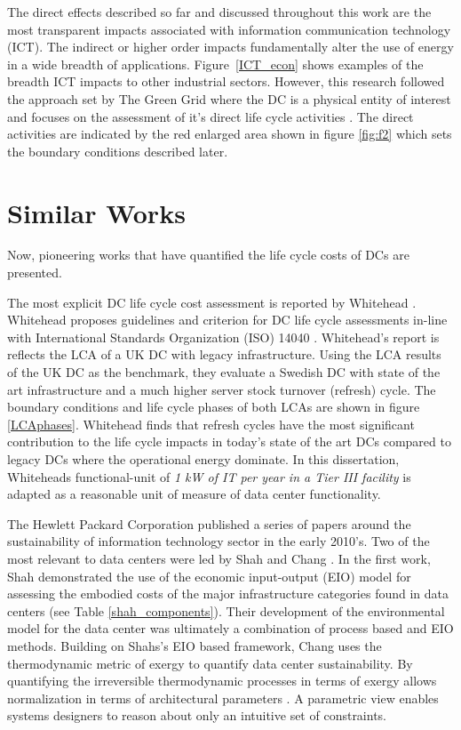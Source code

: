     The direct effects described so far and discussed throughout this work are the most transparent impacts associated with information communication technology (ICT). The indirect or higher order impacts fundamentally alter the use of energy in a wide breadth of applications. Figure~\ref{ICT_econ} shows examples of the breadth ICT impacts to other industrial sectors. However, this research followed the approach set by The Green Grid where the DC is a physical entity of interest and focuses on the assessment of it's direct life cycle activities \cite{tgg12}. The direct activities are indicated by the red enlarged area shown in figure \ref{fig:f2} which sets the boundary conditions described later. 
    
    
    
\section{Similar Works}
 \label{sec: similar works}  
    Now, pioneering works that have quantified the life cycle costs of DCs are presented. 
    
    The most explicit DC life cycle cost assessment is reported by Whitehead \cite{whitehead15}. Whitehead proposes guidelines and criterion for DC life cycle assessments in-line with International Standards Organization (ISO) 14040 \cite{ISO14040}. Whitehead's report is reflects the LCA of a UK DC with legacy infrastructure. Using the LCA results of the UK DC as the benchmark, they evaluate a Swedish DC with state of the art infrastructure and a much higher server stock turnover (refresh) cycle. The boundary conditions and life cycle phases of both LCAs are shown in figure \ref{LCAphases}. Whitehead finds that refresh cycles have the most significant contribution to the life cycle impacts in today's state of the art DCs compared to legacy DCs where the operational energy dominate. In this dissertation, Whiteheads functional-unit of \textit{1 kW of IT per year in a Tier III facility} is adapted as a reasonable unit of measure of data center functionality.
    
    
    
    The Hewlett Packard Corporation published a series of papers around the sustainability of information technology sector in the early 2010's. Two of the most relevant to data centers were led by Shah and Chang \cite{shah11, shah12}. In the first work, Shah demonstrated the use of the economic input-output (EIO) model for assessing the embodied costs of the major infrastructure categories found in data centers (see Table \ref{shah_components}). Their development of the environmental model for the data center was ultimately a combination of process based and EIO methods. Building on Shahs's EIO based framework, Chang uses the thermodynamic metric of exergy to quantify data center sustainability. By quantifying the irreversible thermodynamic processes in terms of exergy allows normalization in terms of architectural parameters \cite{shah12}. A parametric view enables systems designers to reason about only an intuitive set of constraints.
    
